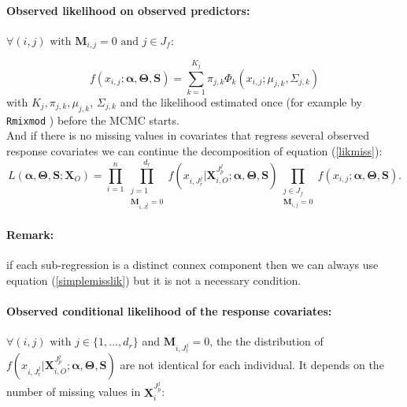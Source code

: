 \documentclass[12pt,a4paper]{report}
\begin{document}
\paragraph{Observed likelihood on observed predictors:} $\forall (i,j) \textrm{ with } \boldsymbol{M}_{i,j}= 0 \textrm{ and } j \in J_f $:

	 \begin{equation}
	 f(x_{i,j};\boldsymbol{\alpha},\boldsymbol{\Theta},\boldsymbol{S})=\sum_{k=1}^{K_j}\pi_{j,k}\Phi_k(x_{i,j};\mu_{j,k},\Sigma_{j,k}) \label{likmissdroite}
	 \end{equation} with $K_j,\pi_{j,k}, \mu_{j,k}$, $\Sigma_{j,k}$ and the likelihood estimated once (for example by {\tt Rmixmod} \cite{packageRmixmod}) before the MCMC starts. 
	 \\
	 
And if there is no missing values in covariates that regress several observed response covariates we can continue the decomposition of equation (\ref{likmiss}):
	\begin{equation}
		L(\boldsymbol{\alpha},\boldsymbol{\Theta},\boldsymbol{S};\boldsymbol{X}_O)=\prod_{i=1}^n\prod_{\substack{j =1 \\ \boldsymbol{M}_{i,J_r^j}=0}}^{d_r}f(x_{i,J_r^j}|\boldsymbol{X}^{J_p^j}_{i,O};\boldsymbol{\alpha},\boldsymbol{\Theta},\boldsymbol{S})\prod_{\substack{j \in J_f \\ \boldsymbol{M}_{i,j}=0}}f(x_{i,j};\boldsymbol{\alpha},\boldsymbol{\Theta},\boldsymbol{S}). \label{simplemisslik}
\end{equation}	
\paragraph{Remark:} if each sub-regression is a distinct connex component then we can always use equation (\ref{simplemisslik}) but it is not a necessary condition.

	\paragraph{Observed conditional likelihood of the response covariates:} $\forall (i,j) \textrm{ with }  j \in \{1,\dots,d_r \}$ and $\boldsymbol{M}_{i,J_r^{j}}= 0$, the  the distribution of $f(x_{i,J_r^j}|\boldsymbol{X}_{i,O}^{J_p^j};\boldsymbol{\alpha},\boldsymbol{\Theta},\boldsymbol{S})$ are not identical for each individual. It depends on the number of missing values in $\boldsymbol{X}_i^{J_p^{j}} $:
	
\end{document}
